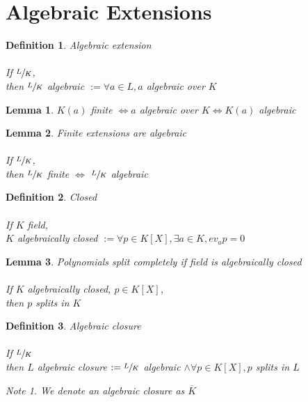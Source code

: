 \documentclass{article}
\theoremstyle{definitionstyle}
\newtheorem{defn}{Definition}[section]
\theoremstyle{lemmastyle}
\newtheorem{lem}{Lemma}[section]
\theoremstyle{remark}
\newtheorem*{note}{Note}
\begin{document}
\section{Algebraic Extensions}

\begin{defn} Algebraic extension\\
\\
If $\sfrac{L}{K}$,\\

then $\sfrac{L}{K}$ algebraic $:= \forall a \in L, a$ algebraic over $K$\end{defn}
\begin{lem} $K(a)$ finite $\iff a$ algebraic over $K \iff K(a)$ algebraic\end{lem}
\begin{lem} Finite extensions are algebraic\\
\\
If $\sfrac{L}{K}$,\\

then $\sfrac{L}{K}$ finite $\iff$ $\sfrac{L}{K}$ algebraic\end{lem}
\begin{defn} Closed\\
\\
If $K$ field,\\

$K$ algebraically closed $:= \forall p \in K[X], \exists a \in K, ev_a p = 0$ \end{defn}
\begin{lem} Polynomials split completely if field is algebraically closed\\
\\
If $K$ algebraically closed, $p \in K[X]$,\\

then $p$ splits in $K$\end{lem}
\begin{defn} Algebraic closure\\
\\
If $\sfrac{L}{K}$\\

then $L$ algebraic closure $:= \sfrac{L}{K}$ algebraic $\land \forall p \in K[X], p$ splits in $L$\\

\begin{note} We denote an algebraic closure as $\overline{K}$ \end{note} \end{defn}
\end{document}
